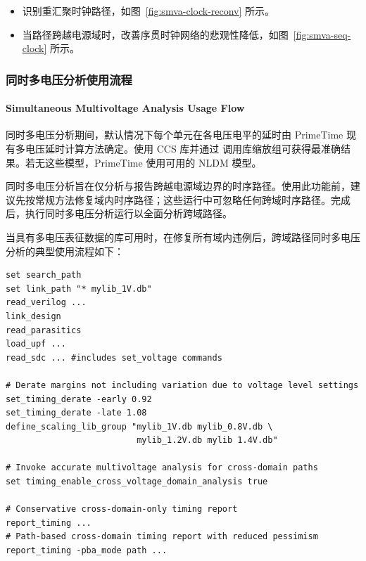 
\begin{itemize}
  \item 识别重汇聚时钟路径，如图~\ref{fig:smva-clock-reconv} 所示。
\end{itemize}


\begin{itemize}
  \item 当路径跨越电源域时，改善序贯时钟网络的悲观性降低，如图~\ref{fig:smva-seq-clock} 所示。
\end{itemize}


\subsubsection{同时多电压分析使用流程}
\paragraph*{Simultaneous Multivoltage Analysis Usage Flow}

同时多电压分析期间，默认情况下每个单元在各电压电平的延时由 PrimeTime 现有多电压延时计算方法确定。使用 CCS 库并通过  调用库缩放组可获得最准确结果。若无这些模型，PrimeTime 使用可用的 NLDM 模型。

同时多电压分析旨在仅分析与报告跨越电源域边界的时序路径。使用此功能前，建议先按常规方法修复域内时序路径；这些运行中可忽略任何跨域时序路径。完成后，执行同时多电压分析运行以全面分析跨域路径。

当具有多电压表征数据的库可用时，在修复所有域内违例后，跨域路径同时多电压分析的典型使用流程如下：
\begin{lstlisting}
set search_path
set link_path "* mylib_1V.db"
read_verilog ...
link_design
read_parasitics
load_upf ...
read_sdc ... #includes set_voltage commands

# Derate margins not including variation due to voltage level settings
set_timing_derate -early 0.92
set_timing_derate -late 1.08
define_scaling_lib_group "mylib_1V.db mylib_0.8V.db \
                          mylib_1.2V.db mylib 1.4V.db"

# Invoke accurate multivoltage analysis for cross-domain paths
set timing_enable_cross_voltage_domain_analysis true

# Conservative cross-domain-only timing report
report_timing ...
# Path-based cross-domain timing report with reduced pessimism
report_timing -pba_mode path ...
\end{lstlisting}

